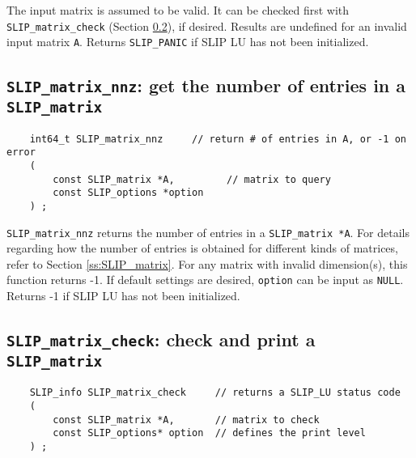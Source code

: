 \documentclass[12pt]{article}
\theoremstyle{definition}
\begin{document}
The input matrix is assumed to be valid. It can be checked first with
\verb|SLIP_matrix_check| (Section \ref{s:user:matrix_check}), if desired.
Results are undefined for an invalid input matrix \verb|A|.  Returns
\verb|SLIP_PANIC| if SLIP LU has not been initialized.

\cprotect\subsection{\verb|SLIP_matrix_nnz|: get the number of entries in a
\verb|SLIP_matrix|}
\label{s:user:matrix_nnz}

\begin{mdframed}[userdefinedwidth=6in]
{\footnotesize
\begin{verbatim}
    int64_t SLIP_matrix_nnz     // return # of entries in A, or -1 on error
    (
        const SLIP_matrix *A,         // matrix to query
        const SLIP_options *option
    ) ;
\end{verbatim}
} \end{mdframed}

\verb|SLIP_matrix_nnz| returns the number of entries in a \verb|SLIP_matrix *A|.
For details regarding how the number of entries is obtained for different kinds
of matrices, refer to Section \ref{ss:SLIP_matrix}.
For any matrix with invalid dimension(s), this function returns -1.
If default settings are desired, \verb|option| can be input as \verb|NULL|.
Returns -1 if SLIP LU has not been initialized.

\newpage
\cprotect\subsection{\verb|SLIP_matrix_check|: check and print a \verb|SLIP_matrix|}
\label{s:user:matrix_check}

\begin{mdframed}[userdefinedwidth=6in]
{\footnotesize
\begin{verbatim}
    SLIP_info SLIP_matrix_check     // returns a SLIP_LU status code
    (
        const SLIP_matrix *A,       // matrix to check
        const SLIP_options* option  // defines the print level
    ) ;
\end{verbatim}
} \end{mdframed}
\end{document}

